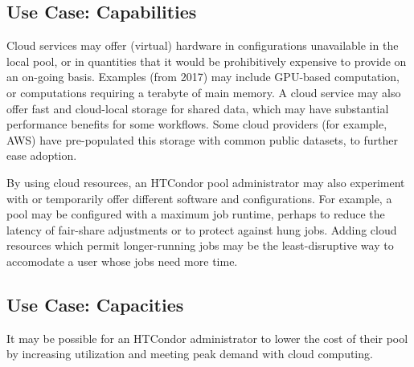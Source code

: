 \subsection{Use Case: Capabilities}

Cloud services may offer (virtual) hardware in configurations unavailable in
the local pool, or in quantities that it would be prohibitively expensive to
provide on an on-going basis.  Examples (from 2017) may include GPU-based
computation, or computations requiring a terabyte of main memory.  A cloud
service may also offer fast and cloud-local storage for shared data, which
may have substantial performance benefits for some workflows.  Some cloud
providers (for example, AWS) have pre-populated this storage with common
public datasets, to further ease adoption.

By using cloud resources, an HTCondor pool administrator may also experiment
with or temporarily offer different software and configurations.  For
example, a pool may be configured with a maximum job runtime, perhaps to
reduce the latency of fair-share adjustments or to protect against hung
jobs.  Adding cloud resources which permit longer-running jobs may be the
least-disruptive way to accomodate a user whose jobs need more time.

\subsection{Use Case: Capacities}

It may be possible for an HTCondor administrator to lower the cost of their
pool by increasing utilization and meeting peak demand with cloud computing.
